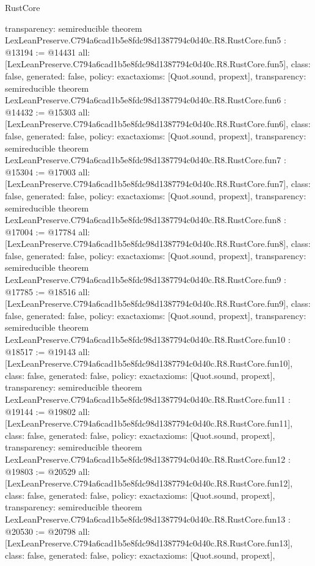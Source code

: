 \begin{lexlean}{RustCore}
\begin{coremodule}
{  transparency: semireducible
}
theorem LexLeanPreserve.C794a6cad1b5e8fdc98d1387794c0d40c.R8.RustCore.fun5 : @13194 := @14431 {
  all: [LexLeanPreserve.C794a6cad1b5e8fdc98d1387794c0d40c.R8.RustCore.fun5],
  class: false,
  generated: false,
  policy: exact{axioms: [Quot.sound, propext]},
  transparency: semireducible
}
theorem LexLeanPreserve.C794a6cad1b5e8fdc98d1387794c0d40c.R8.RustCore.fun6 : @14432 := @15303 {
  all: [LexLeanPreserve.C794a6cad1b5e8fdc98d1387794c0d40c.R8.RustCore.fun6],
  class: false,
  generated: false,
  policy: exact{axioms: [Quot.sound, propext]},
  transparency: semireducible
}
theorem LexLeanPreserve.C794a6cad1b5e8fdc98d1387794c0d40c.R8.RustCore.fun7 : @15304 := @17003 {
  all: [LexLeanPreserve.C794a6cad1b5e8fdc98d1387794c0d40c.R8.RustCore.fun7],
  class: false,
  generated: false,
  policy: exact{axioms: [Quot.sound, propext]},
  transparency: semireducible
}
theorem LexLeanPreserve.C794a6cad1b5e8fdc98d1387794c0d40c.R8.RustCore.fun8 : @17004 := @17784 {
  all: [LexLeanPreserve.C794a6cad1b5e8fdc98d1387794c0d40c.R8.RustCore.fun8],
  class: false,
  generated: false,
  policy: exact{axioms: [Quot.sound, propext]},
  transparency: semireducible
}
theorem LexLeanPreserve.C794a6cad1b5e8fdc98d1387794c0d40c.R8.RustCore.fun9 : @17785 := @18516 {
  all: [LexLeanPreserve.C794a6cad1b5e8fdc98d1387794c0d40c.R8.RustCore.fun9],
  class: false,
  generated: false,
  policy: exact{axioms: [Quot.sound, propext]},
  transparency: semireducible
}
theorem LexLeanPreserve.C794a6cad1b5e8fdc98d1387794c0d40c.R8.RustCore.fun10 : @18517 := @19143 {
  all: [LexLeanPreserve.C794a6cad1b5e8fdc98d1387794c0d40c.R8.RustCore.fun10],
  class: false,
  generated: false,
  policy: exact{axioms: [Quot.sound, propext]},
  transparency: semireducible
}
theorem LexLeanPreserve.C794a6cad1b5e8fdc98d1387794c0d40c.R8.RustCore.fun11 : @19144 := @19802 {
  all: [LexLeanPreserve.C794a6cad1b5e8fdc98d1387794c0d40c.R8.RustCore.fun11],
  class: false,
  generated: false,
  policy: exact{axioms: [Quot.sound, propext]},
  transparency: semireducible
}
theorem LexLeanPreserve.C794a6cad1b5e8fdc98d1387794c0d40c.R8.RustCore.fun12 : @19803 := @20529 {
  all: [LexLeanPreserve.C794a6cad1b5e8fdc98d1387794c0d40c.R8.RustCore.fun12],
  class: false,
  generated: false,
  policy: exact{axioms: [Quot.sound, propext]},
  transparency: semireducible
}
theorem LexLeanPreserve.C794a6cad1b5e8fdc98d1387794c0d40c.R8.RustCore.fun13 : @20530 := @20798 {
  all: [LexLeanPreserve.C794a6cad1b5e8fdc98d1387794c0d40c.R8.RustCore.fun13],
  class: false,
  generated: false,
  policy: exact{axioms: [Quot.sound, propext]},
}
\end{coremodule}
\end{lexlean}
